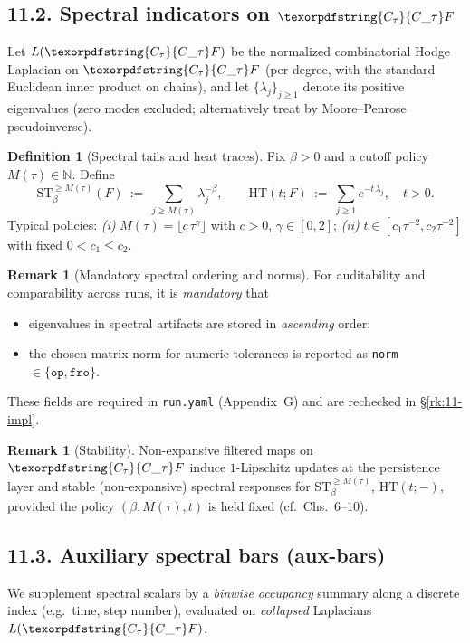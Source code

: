 \documentclass[11pt]{article}
\numberwithin{equation}{section}
\theoremstyle{plain}
\theoremstyle{definition}
\theoremstyle{remark}
\DeclareRobustCommand{\hyp}{\nobreakdash-}
\theoremstyle{plain}
\theoremstyle{definition}
\numberwithin{equation}{section}
\theoremstyle{definition}
\newtheorem{definition}[theorem]{Definition}
\newtheorem{remark}[theorem]{Remark}
\DeclareRobustCommand{\Ctau}{\texorpdfstring{\ensuremath{C_{\tau}}}{C\_\tau}}
\numberwithin{equation}{section}
\theoremstyle{plain}
\theoremstyle{definition}
\theoremstyle{remark}
\providecommand{\Cfun}[1]{\mathsf{C}_{#1}}
\providecommand{\Ctau}{\Cfun{\tau}}
\begin{document}
\subsection*{11.2. Spectral indicators on \texorpdfstring{$\Ctau F$}{C\_tau F}}
Let $L(\Ctau F)$ be the normalized combinatorial Hodge Laplacian on $\Ctau F$ (per degree, with the standard Euclidean inner product on chains), and let $\{\lambda_{j}\}_{j\ge 1}$ denote its positive eigenvalues (zero modes excluded; alternatively treat by Moore–Penrose pseudoinverse).
\begin{definition}[Spectral tails and heat traces]\label{def:11-spectral}
Fix $\beta>0$ and a cutoff policy $M(\tau)\in\mathbb{N}$. Define
\[
  \mathrm{ST}_{\beta}^{\ge M(\tau)}(F)\ :=\ \sum_{j\ge M(\tau)} \lambda_{j}^{-\beta},\qquad \mathrm{HT}(t;F)\ :=\ \sum_{j\ge 1} e^{-t\,\lambda_{j}},\quad t>0.
\]
Typical policies: \emph{(i)} $M(\tau)=\lfloor c\,\tau^{\gamma}\rfloor$ with $c>0$, $\gamma\in[0,2]$; \emph{(ii)} $t\in[c_1\tau^{-2},c_2\tau^{-2}]$ with fixed $0<c_1\le c_2$.
\end{definition}

\begin{remark}[Mandatory spectral ordering and norms]\label{rk:11-spectral-order-norm}
For auditability and comparability across runs, it is \emph{mandatory} that
\begin{itemize}
  \item eigenvalues in spectral artifacts are stored in \emph{ascending} order;
  \item the chosen matrix norm for numeric tolerances is reported as \texttt{norm} $\in\{\texttt{op},\texttt{fro}\}$.
\end{itemize}
These fields are required in \texttt{run.yaml} (Appendix~G) and are rechecked in \S\ref{rk:11-impl}.
\end{remark}

\begin{remark}[Stability]
Non\hyp expansive filtered maps on $\Ctau F$ induce $1$-Lipschitz updates at the persistence layer and stable (non\hyp expansive) spectral responses for $\mathrm{ST}_{\beta}^{\ge M(\tau)}$, $\mathrm{HT}(t;-)$, provided the policy $(\beta,M(\tau),t)$ is held fixed (cf.\ Chs.~6–10).
\end{remark}

\subsection*{11.3. Auxiliary spectral bars (aux-bars)}
We supplement spectral scalars by a \emph{binwise occupancy} summary along a discrete index (e.g.\ time, step number), evaluated on \emph{collapsed} Laplacians $L(\Ctau F)$.
\end{document}
